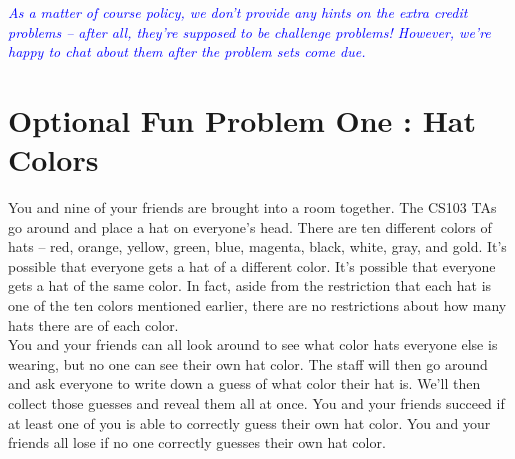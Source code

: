 \documentclass{article}
\renewcommand{\(}{\left(}
\renewcommand{\)}{\right)}
\newcommand{\annotate}[1]{\textit{\textcolor{blue}{#1}}}
\theoremstyle{plain}
\theoremstyle{plain}
\theoremstyle{definition}
\begin{document}
\annotate{As a matter of course policy, we don't provide any hints on the extra credit problems -- after all, they're supposed to be challenge problems! However, we're happy to chat about them after the problem sets come due.}

\section*{Optional Fun Problem One : Hat Colors}

You and nine of your friends are brought into a room together. The CS103 TAs go around and place a hat on everyone's head. There are ten different colors of hats -- red, orange, yellow, green, blue, magenta, black, white, gray, and gold. It's possible that everyone gets a hat of a different color. It's possible that everyone gets a hat of the same color. In fact, aside from the restriction that each hat is one of the ten colors mentioned earlier, there are no restrictions about how many hats there are of each color. \\

You and your friends can all look around to see what color hats everyone else is wearing, but no one can see their own hat color. The staff will then go around and ask everyone to write down a guess of what color their hat is. We'll then collect those guesses and reveal them all at once. You and your friends succeed if at least one of you is able to correctly guess their own hat color. You and your friends all lose if no one correctly guesses their own hat color. \\
\end{document}
